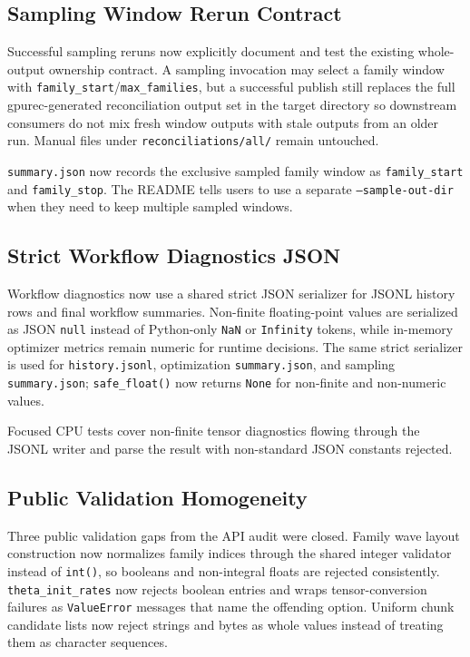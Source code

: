 \documentclass[11pt]{article}
\begin{document}
\subsection{Sampling Window Rerun Contract}

Successful sampling reruns now explicitly document and test the existing
whole-output ownership contract.  A sampling invocation may select a family
window with \texttt{family\_start}/\texttt{max\_families}, but a successful
publish still replaces the full gpurec-generated reconciliation output set in
the target directory so downstream consumers do not mix fresh window outputs
with stale outputs from an older run.  Manual files under
\texttt{reconciliations/all/} remain untouched.

\texttt{summary.json} now records the exclusive sampled family window as
\texttt{family\_start} and \texttt{family\_stop}.  The README tells users to use
a separate \texttt{--sample-out-dir} when they need to keep multiple sampled
windows.

\subsection{Strict Workflow Diagnostics JSON}

Workflow diagnostics now use a shared strict JSON serializer for JSONL history
rows and final workflow summaries.  Non-finite floating-point values are
serialized as JSON \texttt{null} instead of Python-only \texttt{NaN} or
\texttt{Infinity} tokens, while in-memory optimizer metrics remain numeric for
runtime decisions.  The same strict serializer is used for
\texttt{history.jsonl}, optimization \texttt{summary.json}, and sampling
\texttt{summary.json}; \texttt{safe\_float()} now returns \texttt{None} for
non-finite and non-numeric values.

Focused CPU tests cover non-finite tensor diagnostics flowing through the JSONL
writer and parse the result with non-standard JSON constants rejected.

\subsection{Public Validation Homogeneity}

Three public validation gaps from the API audit were closed.  Family wave
layout construction now normalizes family indices through the shared integer
validator instead of \texttt{int()}, so booleans and non-integral floats are
rejected consistently.  \texttt{theta\_init\_rates} now rejects boolean entries
and wraps tensor-conversion failures as \texttt{ValueError} messages that name
the offending option.  Uniform chunk candidate lists now reject strings and
bytes as whole values instead of treating them as character sequences.
\end{document}
